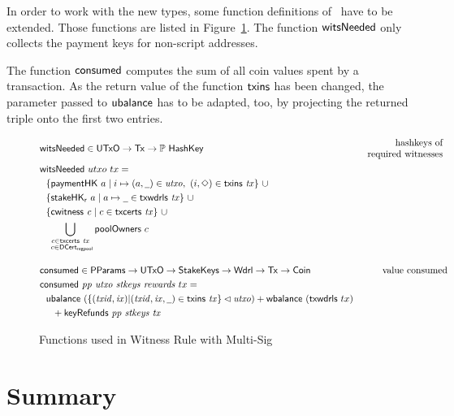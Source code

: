\documentclass[11pt,a4paper,dvipsnames]{article}
\newcommand{\Nothing}{\ensuremath{\Diamond}}
\newcommand{\Tx}{\type{Tx}}
\newcommand{\UTxO}{\type{UTxO}}
\newcommand{\Wdrl}{\type{Wdrl}}
\newcommand{\Coin}{\type{Coin}}
\newcommand{\PParams}{\type{PParams}}
\newcommand{\StakeKeys}{\type{StakeKeys}}
\newcommand{\DCertRegPool}{\type{DCert_{regpool}}}
\newcommand{\HashKey}{\type{HashKey}}
\newcommand{\txins}[1]{\fun{txins}~ \var{#1}}
\newcommand{\txcerts}[1]{\fun{txcerts}~ \var{#1}}
\newcommand{\ubalance}[1]{\fun{ubalance}~ \var{#1}}
\newcommand{\keyRefunds}[3]{\fun{keyRefunds}~ \var{#1}~ \var{#2}~ \var{#3}}
\newcommand{\consumed}[4]{\fun{consumed}~ \var{#1}~ \var{#2}~ \var{#3}~ \var{#4}}
\newcommand{\cwitness}[1]{\fun{cwitness}~ \var{#1}}
\newcommand{\txwdrls}[1]{\fun{txwdrls}~ \var{#1}}
\newcommand{\wcard}[0]{\underline{\phantom{a}}}
\theoremstyle{definition}
\begin{document}
In order to work with the new types, some function definitions
of~\cite{shelley_formal_spec} have to be extended. Those functions are listed in
Figure~\ref{fig:functions-witnesses-multi-sig}. The function $\mathsf{witsNeeded}$
only collects the payment keys for non-script addresses.

The function $\mathsf{consumed}$ computes the sum of all coin values spent by a
transaction. As the return value of the function $\mathsf{txins}$ has been changed,
the parameter passed to $\mathsf{ubalance}$ has to be adapted, too, by projecting
the returned triple onto the first two entries.

\begin{figure}[htb]
  \begin{align*}
    & \fun{witsNeeded} \in \UTxO \to \Tx \to \powerset{\HashKey}
    & \begin{array}{r}
        \text{hashkeys of} \\
        \text{required witnesses}
      \end{array} \\
    & \fun{witsNeeded}~{utxo}~{tx} = \\
    & ~~\{ \fun{paymentHK}~a \mid i \mapsto (a, \wcard) \in
      \var{utxo},~(i,\Nothing)\in\txins{tx}\}~\cup \\
    & ~~\{\fun{stakeHK_r}~a \mid a\mapsto \wcard \in \txwdrls{tx}\}~\cup \\
    & ~~\{\cwitness{c} \mid c \in \txcerts{tx}\}~\cup \\
    & ~~\bigcup_{\substack{c \in \txcerts{tx} \\ ~c \in\DCertRegPool}}
    \fun{poolOwners}~{c}
    \nextdef
    & \fun{consumed} \in \PParams \to \UTxO \to \StakeKeys \to \Wdrl \to \Tx \to \Coin
    & \text{value consumed} \\
    & \consumed{pp}{utxo}{stkeys}{rewards}~{tx} = \\
    & ~~\ubalance{(\{(\var{txid},\var{ix}) \vert (\var{txid}, \var{ix},
      \wcard)\in\txins{tx}\}
      \restrictdom \var{utxo})} +
      \fun{wbalance}~(\fun{txwdrls}~{tx}) \\
    & ~~~~ + \keyRefunds{pp}{stkeys}{tx}
  \end{align*}
  \caption{Functions used in Witness Rule with Multi-Sig}
  \label{fig:functions-witnesses-multi-sig}
\end{figure}

\section{Summary}
\label{sec:summary}
\end{document}
